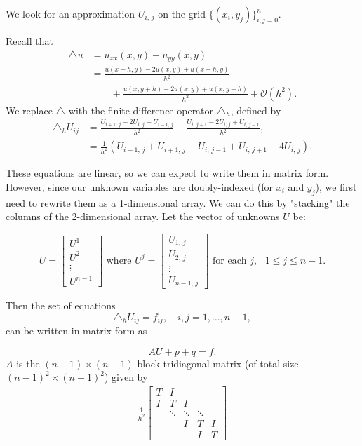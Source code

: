We look for an approximation $U_{i,\,j}$ on the grid $\{(x_i,y_j)\}_{i,j=0}^{n}$.

Recall that
 \begin{align*}
 \triangle u &= u_{xx}(x,y) + u_{yy}(x,y) \\
&= \frac{u(x+h,y) - 2u(x,y)+ u(x-h,y)}{h^2} \\
 & \qquad{}+
 \frac{u(x,y+h) - 2u(x,y)+ u(x,y-h)}{h^2} + \mathcal{O}(h^2).
 \end{align*}
 We replace $\triangle $ with the finite difference operator $\triangle_h$, defined by
 \begin{align}
 \triangle_h U_{ij} &= \frac{U_{i+1,\,j} - 2U_{i,\,j} + U_{i-1,\,j}}{h^2} + \frac{U_{i,\,j+1} - 2U_{i,\,j}+ U_{i,\,j-1}}{h^2},\\
&= \frac{1}{h^2}(U_{i-1,\,j} + U_{i+1,\,j} + U_{i,\,j-1} + U_{i,\,j+1}-4U_{i,\,j}).
\label{eqn:finite_diff_op}
 \end{align}

These equations are linear, so we can expect to write them in matrix form.
However, since our unknown variables are doubly-indexed (for $x_i$ and $y_j$), we first need to rewrite them as a 1-dimensional array.
We can do this by "stacking" the columns of the 2-dimensional array.
Let the vector of unknowns $U$ be:

\[U = \begin{bmatrix} U^1 \\ U^2 \\ \vdots \\ U^{n-1} \end{bmatrix} \text{ where } U^j =
\begin{bmatrix} U_{1,\,j} \\ U_{2,\,j} \\ \vdots \\ U_{n-1,\,j} \end{bmatrix} \text{ for each } j, \text{ }1\leq j \leq n-1.\]

Then the set of equations
\[
\triangle_h U_{ij} = f_{ij}, \quad i,j = 1,\ldots,n-1,
\]%
can be written in matrix form as

\begin{equation} \label{eqn:matrix_form}
AU + p +  q  = f.
\end{equation}
$A$ is the $(n-1) \times (n-1)$ block tridiagonal matrix (of total size $(n-1)^2 \times (n-1)^2$) given by
\begin{align}
	\frac{1}{h^2}
\begin{bmatrix}
T & I & &  &\\
I &T & I & &\\
&\ddots  & \ddots & \ddots & \\
&  & I & T & I \\
&  &  & I & T\end{bmatrix}\label{poisson2d:matrixA}
\end{align}

